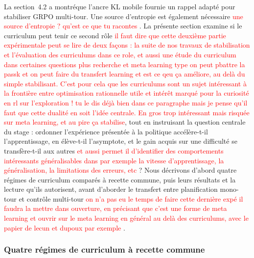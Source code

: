 \documentclass[11pt,a4paper]{article}
\begin{document}
La section~4.2 a montréque l'ancre KL mobile fournie un rappel adapté pour stabiliser GRPO multi-tour. Une source d'entropie est également nécessaire \textcolor{red}{une source d'entropie ? qu'est ce que tu racontes} . La présente section examine si le curriculum peut tenir ce second rôle \textcolor{red}{il faut dire que cette deuxième partie expérimentale peut se lire de deux façons : la suite de nos travaux de stabilisation et l'évaluation des curriculums dans ce role, et aussi une étude du curriculum dans certaines questions plus recherche et meta learning type on peut pbattre la passk et on peut faire du transfert learning et est ce qeu ça améliore, au delà du simple stabilisant. C'est pour cela que les curriculums sont un sujet intéressant à la frontière entre optimisation rationnelle utile et intérêt marqué pour la curiosité en rl sur l'exploration ! tu le dis déjà bien dans ce paragraphe mais je pense qu'il faut que cette dualité en soit l'idée centrale. En gros trop intéressant mais risquée sur meta learning, et au pire ça stabilise}, tout en instruisant la question centrale du stage : ordonner l'expérience présentée à la politique accélère-t-il l'apprentissage, en élève-t-il l'asymptote, et le gain acquis sur une difficulté se transfère-t-il aux autres \textcolor{red}{et aussi permet il d'identifier des comportements intéressants généralisables dans par exemple la vitesse d'apprentissage, la généralisation, la limitations des erreurs, etc} ? Nous décrivons d'abord quatre régimes de curriculum comparés à recette commune, puis leurs résultats et la lecture qu'ils autorisent, avant d'aborder le transfert entre planification mono-tour et contrôle multi-tour \textcolor{red}{on n'a pas eu le temps de faire cette dernière expé il faudra la mettre dans ouverture, en précisant que c'est une forme de meta learning et ouvrir sur le meta learning en général au delà des curriculums, avec le papier de lecun et dupoux par exemple} .

\subsubsection{Quatre régimes de curriculum à recette commune}
\end{document}
